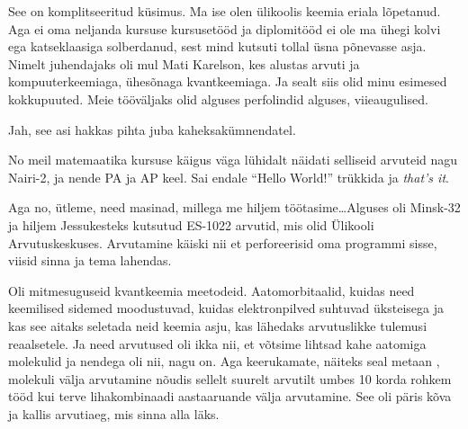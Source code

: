 \label{chptr:lucifer}

                 
See on komplitseeritud küsimus. Ma ise olen ülikoolis keemia eriala lõpetanud. Aga ei oma neljanda kursuse kursusetööd ja 
diplomitööd ei ole ma ühegi kolvi ega katseklaasiga solberdanud, sest  mind 
kutsuti tollal üsna põnevasse asja. Nimelt juhendajaks oli mul Mati 
Karelson, kes alustas arvuti ja kompuuterkeemiaga,  
ühesõnaga kvantkeemiaga.  Ja sealt siis olid minu esimesed kokkupuuted. Meie 
tööväljaks olid alguses perfolindid alguses, viieaugulised.


Jah, see asi hakkas pihta juba kaheksakümnendatel.
                 

No meil matemaatika kursuse käigus väga lühidalt näidati selliseid arvuteid 
nagu Nairi-2, ja nende PA ja AP keel. Sai endale \enquote{Hello World!} trükkida ja 
\emph{that's it}. 

Aga no, ütleme, need masinad, millega me hiljem töötasime\ldots Alguses oli 
Minsk-32 ja hiljem  Jessukesteks kutsutud ES-1022 arvutid, mis olid Ülikooli 
Arvutuskeskuses. Arvutamine käiski nii et  perforeerisid oma programmi sisse, 
viisid sinna ja tema lahendas. 


Oli mitmesuguseid kvantkeemia meetodeid. Aatomorbitaalid, kuidas need 
keemilised sidemed moodustuvad, kuidas elektronpilved suhtuvad üksteisega ja 
kas see aitaks seletada neid keemia asju, kas  lähedaks arvutuslikke tulemusi 
reaalsetele. Ja need arvutused oli ikka nii, et võtsime lihtsad kahe aatomiga 
molekulid ja nendega oli nii,  nagu on. Aga keerukamate, näiteks seal metaan 
,  molekuli välja arvutamine nõudis  sellelt suurelt arvutilt umbes 10 
korda rohkem tööd kui terve lihakombinaadi aastaaruande välja arvutamine. See 
oli päris kõva ja kallis arvutiaeg, mis sinna alla läks.
           

